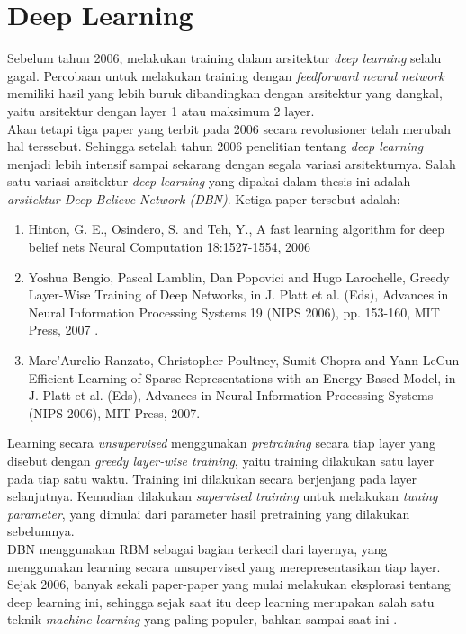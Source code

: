 \section{Deep Learning}

Sebelum tahun 2006, melakukan training dalam arsitektur \textit{deep learning} selalu gagal. Percobaan untuk melakukan training dengan \textit{feedforward neural network} memiliki hasil yang lebih buruk dibandingkan dengan arsitektur yang dangkal, yaitu arsitektur dengan layer 1 atau maksimum 2 layer.\\
Akan tetapi tiga paper yang terbit pada 2006 secara revolusioner telah merubah hal terssebut. Sehingga setelah tahun 2006 penelitian tentang \textit{deep learning} menjadi lebih intensif sampai sekarang dengan segala variasi arsitekturnya. Salah satu variasi arsitektur \textit{deep learning} yang dipakai dalam thesis ini adalah \textit{arsitektur Deep Believe Network (DBN)}. Ketiga paper tersebut adalah:
\begin{enumerate}
\item Hinton, G. E., Osindero, S. and Teh, Y., A fast learning algorithm for deep belief nets Neural Computation 18:1527-1554, 2006 \citep{hinton2006fast}
\item Yoshua Bengio, Pascal Lamblin, Dan Popovici and Hugo Larochelle, Greedy Layer-Wise Training of Deep Networks, in J. Platt et al. (Eds), Advances in Neural Information Processing Systems 19 (NIPS 2006), pp. 153-160, MIT Press, 2007 \citep{bengio2007greedy}.
\item Marc’Aurelio Ranzato, Christopher Poultney, Sumit Chopra and Yann LeCun Efficient Learning of Sparse Representations with an Energy-Based Model, in J. Platt et al. (Eds), Advances in Neural Information Processing Systems (NIPS 2006), MIT Press, 2007\citep{poultney2006efficient}.
\end{enumerate}


Learning secara \textit{unsupervised} menggunakan \textit{pretraining} secara tiap layer yang disebut dengan \textit{greedy layer-wise training}, yaitu training dilakukan  satu layer pada tiap satu waktu. Training ini dilakukan secara berjenjang pada layer selanjutnya. Kemudian dilakukan \textit{supervised training} untuk melakukan \textit{tuning parameter}, yang dimulai dari parameter hasil pretraining yang dilakukan sebelumnya.\\
DBN menggunakan RBM sebagai bagian terkecil dari layernya, yang menggunakan learning secara unsupervised yang merepresentasikan tiap layer. Sejak 2006, banyak sekali paper-paper yang mulai melakukan eksplorasi tentang deep learning ini, sehingga sejak saat itu deep learning merupakan salah satu teknik \textit{machine learning} yang paling populer, bahkan sampai saat ini \citep{tutorial2014lisa}.


